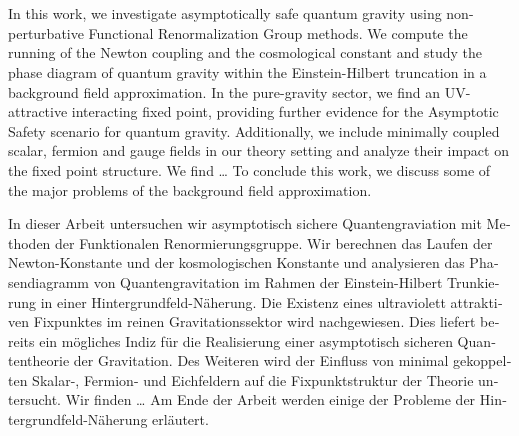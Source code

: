 {\hypersetup{allcolors=black}
\thispagestyle{plain}

\makeatletter

\begin{center}
\textbf{\large\@title} \\
\vspace{.1cm}
\@author \\
\end{center}

\makeatother

In this work, we investigate asymptotically  safe quantum gravity using non-perturbative Functional Renormalization Group methods. We compute the running of the Newton coupling and the cosmological constant and study the phase diagram of quantum gravity within the Einstein-Hilbert truncation in a background field approximation. In the pure-gravity sector, we find an UV-attractive interacting fixed point, providing further evidence for the Asymptotic Safety scenario for quantum gravity. Additionally, we include minimally coupled scalar, fermion and gauge fields in our theory setting and analyze their impact on the fixed point structure. We find \dots %
To conclude this work, we discuss some of the major problems of the background field approximation.


\vfill

\begin{otherlanguage}{german}
In dieser Arbeit untersuchen wir asymptotisch sichere Quantengraviation mit Methoden der Funktionalen Renormierungsgruppe. Wir berechnen das Laufen der Newton-Konstante und der kosmologischen Konstante und analysieren das Phasendiagramm von Quantengravitation im Rahmen der Einstein-Hilbert Trunkierung in einer Hintergrundfeld-N\"aherung. Die Existenz eines ultraviolett attraktiven Fixpunktes im reinen Gravitationssektor wird nachgewiesen. Dies liefert bereits ein m\"ogliches Indiz f\"ur die Realisierung einer asymptotisch sicheren Quantentheorie der Gravitation. Des Weiteren wird der Einfluss von minimal gekoppelten Skalar-, Fermion- und Eichfeldern auf die Fixpunktstruktur der Theorie untersucht. Wir finden \dots %
Am Ende der Arbeit werden einige der Probleme der Hintergrundfeld-N\"aherung erl\"autert.
\end{otherlanguage}
\vfill
\cleardoublepage}
